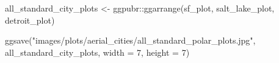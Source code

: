 \documentclass[
  letterpaper,
  DIV=11,
  numbers=noendperiod]{scrreprt}
\newenvironment{Shaded}{\begin{snugshade}}{\end{snugshade}}
\newcommand{\AttributeTok}[1]{\textcolor[rgb]{0.40,0.45,0.13}{#1}}
\newcommand{\DecValTok}[1]{\textcolor[rgb]{0.68,0.00,0.00}{#1}}
\newcommand{\FunctionTok}[1]{\textcolor[rgb]{0.28,0.35,0.67}{#1}}
\newcommand{\NormalTok}[1]{\textcolor[rgb]{0.00,0.23,0.31}{#1}}
\newcommand{\OtherTok}[1]{\textcolor[rgb]{0.00,0.23,0.31}{#1}}
\newcommand{\SpecialCharTok}[1]{\textcolor[rgb]{0.37,0.37,0.37}{#1}}
\newcommand{\StringTok}[1]{\textcolor[rgb]{0.13,0.47,0.30}{#1}}
\begin{document}
\begin{Shaded}
\begin{Highlighting}[]
\NormalTok{all\_standard\_city\_plots }\OtherTok{\textless{}{-}}\NormalTok{ ggpubr}\SpecialCharTok{::}\FunctionTok{ggarrange}\NormalTok{(sf\_plot, }
\NormalTok{                                             salt\_lake\_plot, }
\NormalTok{                                             detroit\_plot)}

\FunctionTok{ggsave}\NormalTok{(}\StringTok{"images/plots/aerial\_cities/all\_standard\_polar\_plots.jpg"}\NormalTok{, }
\NormalTok{       all\_standard\_city\_plots, }
       \AttributeTok{width =} \DecValTok{7}\NormalTok{, }
       \AttributeTok{height =} \DecValTok{7}\NormalTok{)}
\end{Highlighting}
\end{Shaded}
\end{document}
